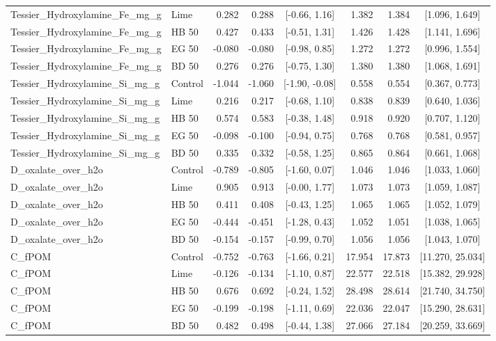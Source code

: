 \documentclass[preprint,12pt]{elsarticle}
\begin{document}
\begin{landscape}
\begin{longtable}{@{} >{\raggedright\arraybackslash}p{4.3cm} l r r c r r c @{}}
Tessier\_\allowbreak{}Hydroxylamine\_\allowbreak{}Fe\_\allowbreak{}mg\_\allowbreak{}g & Lime & 0.282 & 0.288 & [-0.66, 1.16] & 1.382 & 1.384 & [1.096, 1.649] \\
Tessier\_\allowbreak{}Hydroxylamine\_\allowbreak{}Fe\_\allowbreak{}mg\_\allowbreak{}g & HB 50 & 0.427 & 0.433 & [-0.51, 1.31] & 1.426 & 1.428 & [1.141, 1.696] \\
Tessier\_\allowbreak{}Hydroxylamine\_\allowbreak{}Fe\_\allowbreak{}mg\_\allowbreak{}g & EG 50 & -0.080 & -0.080 & [-0.98, 0.85] & 1.272 & 1.272 & [0.996, 1.554] \\
Tessier\_\allowbreak{}Hydroxylamine\_\allowbreak{}Fe\_\allowbreak{}mg\_\allowbreak{}g & BD 50 & 0.276 & 0.276 & [-0.75, 1.30] & 1.380 & 1.380 & [1.068, 1.691] \\
Tessier\_\allowbreak{}Hydroxylamine\_\allowbreak{}Si\_\allowbreak{}mg\_\allowbreak{}g & Control & -1.044 & -1.060 & [-1.90, -0.08] & 0.558 & 0.554 & [0.367, 0.773] \\
Tessier\_\allowbreak{}Hydroxylamine\_\allowbreak{}Si\_\allowbreak{}mg\_\allowbreak{}g & Lime & 0.216 & 0.217 & [-0.68, 1.10] & 0.838 & 0.839 & [0.640, 1.036] \\
Tessier\_\allowbreak{}Hydroxylamine\_\allowbreak{}Si\_\allowbreak{}mg\_\allowbreak{}g & HB 50 & 0.574 & 0.583 & [-0.38, 1.48] & 0.918 & 0.920 & [0.707, 1.120] \\
Tessier\_\allowbreak{}Hydroxylamine\_\allowbreak{}Si\_\allowbreak{}mg\_\allowbreak{}g & EG 50 & -0.098 & -0.100 & [-0.94, 0.75] & 0.768 & 0.768 & [0.581, 0.957] \\
Tessier\_\allowbreak{}Hydroxylamine\_\allowbreak{}Si\_\allowbreak{}mg\_\allowbreak{}g & BD 50 & 0.335 & 0.332 & [-0.58, 1.25] & 0.865 & 0.864 & [0.661, 1.068] \\
D\_oxalate\_over\_h2o & Control & -0.789 & -0.805 & [-1.60, 0.07] & 1.046 & 1.046 & [1.033, 1.060] \\
D\_oxalate\_over\_h2o & Lime & 0.905 & 0.913 & [-0.00, 1.77] & 1.073 & 1.073 & [1.059, 1.087] \\
D\_oxalate\_over\_h2o & HB 50 & 0.411 & 0.408 & [-0.43, 1.25] & 1.065 & 1.065 & [1.052, 1.079] \\
D\_oxalate\_over\_h2o & EG 50 & -0.444 & -0.451 & [-1.28, 0.43] & 1.052 & 1.051 & [1.038, 1.065] \\
D\_oxalate\_over\_h2o & BD 50 & -0.154 & -0.157 & [-0.99, 0.70] & 1.056 & 1.056 & [1.043, 1.070] \\
C\_fPOM & Control & -0.752 & -0.763 & [-1.66, 0.21] & 17.954 & 17.873 & [11.270, 25.034] \\
C\_fPOM & Lime & -0.126 & -0.134 & [-1.10, 0.87] & 22.577 & 22.518 & [15.382, 29.928] \\
C\_fPOM & HB 50 & 0.676 & 0.692 & [-0.24, 1.52] & 28.498 & 28.614 & [21.740, 34.750] \\
C\_fPOM & EG 50 & -0.199 & -0.198 & [-1.11, 0.69] & 22.036 & 22.047 & [15.290, 28.631] \\
C\_fPOM & BD 50 & 0.482 & 0.498 & [-0.44, 1.38] & 27.066 & 27.184 & [20.259, 33.669] \\
\end{longtable}


\end{landscape}
\end{document}
